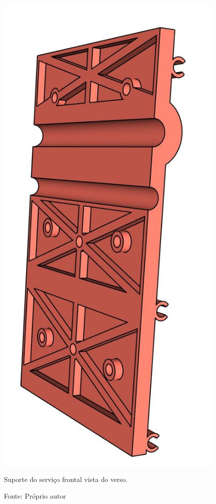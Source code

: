 \begin{figure}[H]
\centering
\includegraphics[scale = 0.4]{figuras/ressuporteservicofrontalfv}
\caption{Suporte do serviço frontal vista do verso.}
\caption*{Fonte: Próprio autor}
\label{fig:ressuporteservicofrontalfv}
\end{figure}
        
